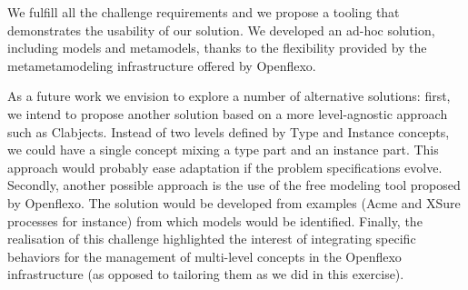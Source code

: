 

We fulfill all the challenge requirements and we propose a tooling that demonstrates the usability of our solution.  We developed an ad-hoc solution, including models and metamodels, thanks to the flexibility provided by the metametamodeling infrastructure offered by Openflexo.

As a future work we envision to explore a number of alternative solutions: first, we intend to propose another solution based on a more level-agnostic approach such as Clabjects. Instead of two levels defined by Type and Instance concepts, we could have a single concept mixing a type part and an instance part. This approach would probably ease adaptation if the problem specifications evolve. Secondly, another possible approach is the use of the free modeling tool proposed by Openflexo. The solution would be developed from examples (Acme and XSure processes for instance) from which models would be identified. Finally, the realisation of this challenge highlighted the interest of integrating specific behaviors for the management of multi-level concepts in the Openflexo infrastructure (as opposed to tailoring them as we did in this exercise). %
